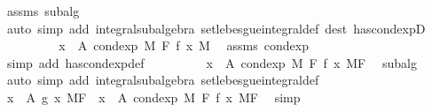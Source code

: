 \begin{isabellebody}
\ assms\ subalg\ \isamarkupfalse%
\ {\isacharparenleft}{\kern0pt}auto\ simp\ add{\isacharcolon}{\kern0pt}\ integral{\isacharunderscore}{\kern0pt}subalgebra{}\ set{\isacharunderscore}{\kern0pt}lebesgue{\isacharunderscore}{\kern0pt}integral{\isacharunderscore}{\kern0pt}def\ dest{\isacharbang}{\kern0pt}{\isacharcolon}{\kern0pt}\ has{\isacharunderscore}{\kern0pt}cond{\isacharunderscore}{\kern0pt}expD{\isacharparenright}{\kern0pt}\isanewline
\ \ \ \ \isamarkupfalse%
\ \isamarkupfalse%
\ {\isachardoublequoteopen}{\isachardot}{\kern0pt}{\isachardot}{\kern0pt}{\isachardot}{\kern0pt}\ {\isacharequal}{\kern0pt}\ {\isacharparenleft}{\kern0pt}{\isasymintegral}x\ {\isasymin}\ A{\isachardot}{\kern0pt}\ cond{\isacharunderscore}{\kern0pt}exp\ M\ F\ f\ x\ {\isasympartial}M{\isacharparenright}{\kern0pt}{\isachardoublequoteclose}\ \isamarkupfalse%
\ assms\ cond{\isacharunderscore}{\kern0pt}exp\ \isamarkupfalse%
\ {\isacharparenleft}{\kern0pt}simp\ add{\isacharcolon}{\kern0pt}\ has{\isacharunderscore}{\kern0pt}cond{\isacharunderscore}{\kern0pt}exp{\isacharunderscore}{\kern0pt}def{\isacharparenright}{\kern0pt}\isanewline
\ \ \ \ \isamarkupfalse%
\ \isamarkupfalse%
\ {\isachardoublequoteopen}{\isachardot}{\kern0pt}{\isachardot}{\kern0pt}{\isachardot}{\kern0pt}\ {\isacharequal}{\kern0pt}\ {\isacharparenleft}{\kern0pt}{\isasymintegral}x\ {\isasymin}\ A{\isachardot}{\kern0pt}\ cond{\isacharunderscore}{\kern0pt}exp\ M\ F\ f\ x\ {\isasympartial}{\isacharquery}{\kern0pt}MF{\isacharparenright}{\kern0pt}{\isachardoublequoteclose}\ \isamarkupfalse%
\ subalg\ \isamarkupfalse%
\ {\isacharparenleft}{\kern0pt}auto\ simp\ add{\isacharcolon}{\kern0pt}\ integral{\isacharunderscore}{\kern0pt}subalgebra{}\ set{\isacharunderscore}{\kern0pt}lebesgue{\isacharunderscore}{\kern0pt}integral{\isacharunderscore}{\kern0pt}def{\isacharparenright}{\kern0pt}\isanewline
\ \ \ \ \isamarkupfalse%
\ \isamarkupfalse%
\ {\isachardoublequoteopen}{\isacharparenleft}{\kern0pt}{\isasymintegral}x\ {\isasymin}\ A{\isachardot}{\kern0pt}\ g\ x\ {\isasympartial}{\isacharquery}{\kern0pt}MF{\isacharparenright}{\kern0pt}\ {\isacharequal}{\kern0pt}\ {\isacharparenleft}{\kern0pt}{\isasymintegral}x\ {\isasymin}\ A{\isachardot}{\kern0pt}\ cond{\isacharunderscore}{\kern0pt}exp\ M\ F\ f\ x\ {\isasympartial}{\isacharquery}{\kern0pt}MF{\isacharparenright}{\kern0pt}{\isachardoublequoteclose}\ \isamarkupfalse%
\ simp\isanewline

\end{isabellebody}
